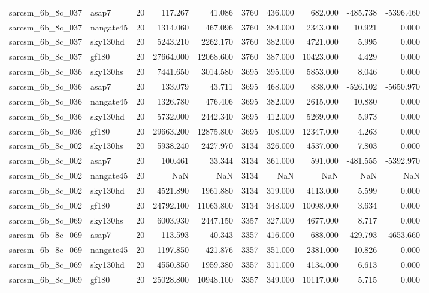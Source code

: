 \documentclass{article}
\begin{document}
\begin{longtable}{llrrrrrrrr}
sarcsm\_6b\_8c\_037 & asap7 & 20 & 117.267 & 41.086 & 3760 & 436.000 & 682.000 & -485.738 & -5396.460 \\
sarcsm\_6b\_8c\_037 & nangate45 & 20 & 1314.060 & 467.096 & 3760 & 384.000 & 2343.000 & 10.921 & 0.000 \\
sarcsm\_6b\_8c\_037 & sky130hd & 20 & 5243.210 & 2262.170 & 3760 & 382.000 & 4721.000 & 5.995 & 0.000 \\
sarcsm\_6b\_8c\_037 & gf180 & 20 & 27664.000 & 12068.600 & 3760 & 387.000 & 10423.000 & 4.429 & 0.000 \\
sarcsm\_6b\_8c\_036 & sky130hs & 20 & 7441.650 & 3014.580 & 3695 & 395.000 & 5853.000 & 8.046 & 0.000 \\
sarcsm\_6b\_8c\_036 & asap7 & 20 & 133.079 & 43.711 & 3695 & 468.000 & 838.000 & -526.102 & -5650.970 \\
sarcsm\_6b\_8c\_036 & nangate45 & 20 & 1326.780 & 476.406 & 3695 & 382.000 & 2615.000 & 10.880 & 0.000 \\
sarcsm\_6b\_8c\_036 & sky130hd & 20 & 5732.000 & 2442.340 & 3695 & 412.000 & 5269.000 & 5.973 & 0.000 \\
sarcsm\_6b\_8c\_036 & gf180 & 20 & 29663.200 & 12875.800 & 3695 & 408.000 & 12347.000 & 4.263 & 0.000 \\
sarcsm\_6b\_8c\_002 & sky130hs & 20 & 5938.240 & 2427.970 & 3134 & 326.000 & 4537.000 & 7.803 & 0.000 \\
sarcsm\_6b\_8c\_002 & asap7 & 20 & 100.461 & 33.344 & 3134 & 361.000 & 591.000 & -481.555 & -5392.970 \\
sarcsm\_6b\_8c\_002 & nangate45 & 20 & NaN & NaN & 3134 & NaN & NaN & NaN & NaN \\
sarcsm\_6b\_8c\_002 & sky130hd & 20 & 4521.890 & 1961.880 & 3134 & 319.000 & 4113.000 & 5.599 & 0.000 \\
sarcsm\_6b\_8c\_002 & gf180 & 20 & 24792.100 & 11063.800 & 3134 & 348.000 & 10098.000 & 3.634 & 0.000 \\
sarcsm\_6b\_8c\_069 & sky130hs & 20 & 6003.930 & 2447.150 & 3357 & 327.000 & 4677.000 & 8.717 & 0.000 \\
sarcsm\_6b\_8c\_069 & asap7 & 20 & 113.593 & 40.343 & 3357 & 416.000 & 688.000 & -429.793 & -4653.660 \\
sarcsm\_6b\_8c\_069 & nangate45 & 20 & 1197.850 & 421.876 & 3357 & 351.000 & 2381.000 & 10.826 & 0.000 \\
sarcsm\_6b\_8c\_069 & sky130hd & 20 & 4550.850 & 1959.380 & 3357 & 311.000 & 4134.000 & 6.613 & 0.000 \\
sarcsm\_6b\_8c\_069 & gf180 & 20 & 25028.800 & 10948.100 & 3357 & 349.000 & 10117.000 & 5.715 & 0.000 \\

\end{longtable}
\end{document}
